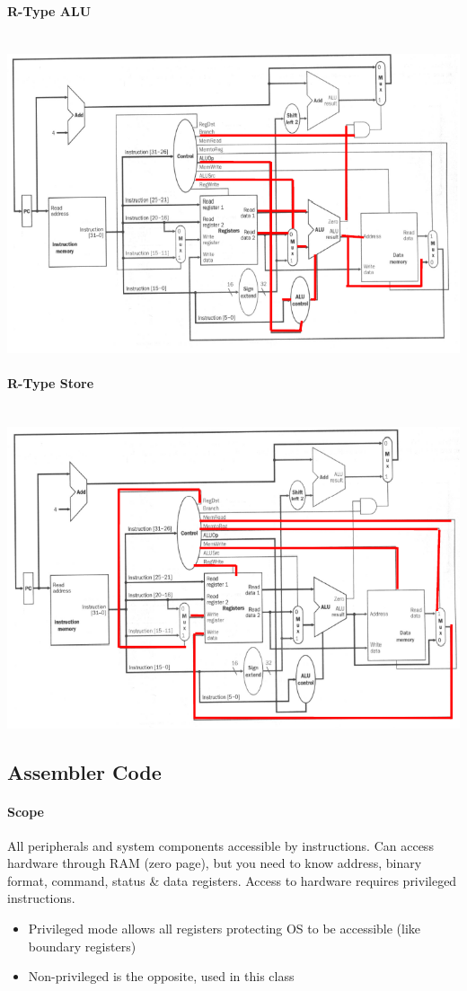 \documentclass[12 pt]{article}
\begin{document}
	\paragraph{R-Type ALU}~\\ \includegraphics[scale=0.7]{ralu}
	\paragraph{R-Type Store}~\\ \includegraphics[scale=0.7]{rstr}
	\subsection{Assembler Code}
	\paragraph{Scope} All peripherals and system components accessible by instructions. Can access hardware through RAM (zero page), but you need to know address, binary format, command, status \& data registers. Access to hardware requires privileged instructions.
	\begin{itemize}
	\item Privileged mode allows all registers protecting OS to be accessible (like boundary registers)
	\item Non-privileged is the opposite, used in this class
\end{itemize}
\end{document}
